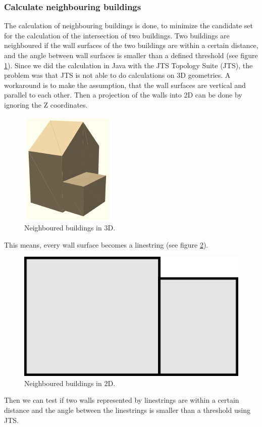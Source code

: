 \subsubsection{Calculate neighbouring buildings}
The calculation of neighbouring buildings is done, to minimize the candidate set for the calculation of the intersection of two buildings. Two buildings are neighboured if the wall surfaces of the two buildings are within a certain distance, and the angle between wall surfaces is smaller than a defined threshold (see figure \ref{fig:neighbours3d}). 
Since we did the calculation in Java with the JTS Topology Suite (JTS), the problem was that JTS is not able to do calculations on 3D geometries. A workaround is to make the assumption, that the wall surfaces are vertical and parallel to each other. Then a projection of the walls into 2D can be done by ignoring the Z coordinates.
\begin{figure}[h]
	\centering
 	 \includegraphics[scale=0.35]{phase1/group1/neighbours3d.png}
	\caption{Neighboured buildings in 3D.}
	 \label{fig:neighbours3d}
\end{figure}
This means, every wall surface becomes a linestring (see figure \ref{fig:neighbours2d}).
\begin{figure}[h]
	\centering
 	 \includegraphics[scale=0.8]{phase1/group1/neighbours2d.png}
	\caption{Neighboured buildings in 2D.}
	\label{fig:neighbours2d}
\end{figure}
Then we can test if two walls represented by linestrings are within a certain distance and the angle between the linestrings is smaller than a threshold using JTS.

